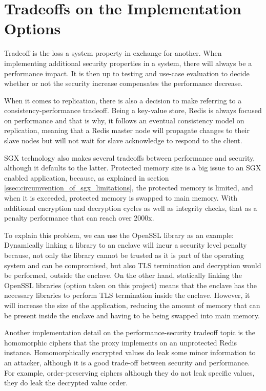 \section{Tradeoffs on the Implementation Options}
\label{sec:tradeoffs_implementation_options}

Tradeoff is the loss a system property in exchange for another. When implementing additional security properties in a system, there will always be a performance impact. It is then up to testing and use-case evaluation to decide whether or not the security increase compensates the performance decrease.

When it comes to replication, there is also a decision to make referring to a consistency-performance tradeoff. Being a key-value store, Redis is always focused on performance and that is why, it follows an eventual consistency model on replication, meaning that a Redis master node will propagate changes to their slave nodes but will not wait for slave acknowledge to respond to the client.

\gls{SGX} technology also makes several tradeoffs between performance and security, although it defaults to the latter. Protected memory size is a big issue to an \gls{SGX} enabled application, because, as explained in section \ref{ssec:circumvention_of_sgx_limitations}, the protected memory is limited, and when it is exceeded, protected memory is swapped to main memory. With additional encryption and decryption cycles as well as integrity checks, that as a penalty performance that can reach over 2000x. 

To explain this problem, we can use the OpenSSL library as an example: Dynamically linking a library to an enclave will incur a security level penalty because, not only the library cannot be trusted as it is part of the operating system and can be compromised, but also \gls{TLS} termination and decryption would be performed, outside the enclave. On the other hand, statically linking the OpenSSL libraries (option taken on this project) means that the enclave has the necessary libraries to perform \gls{TLS} termination inside the enclave. However, it will increase the size of the application, reducing the amount of memory that can be present inside the enclave and having to be being swapped into main memory.

Another implementation detail on the performance-security tradeoff topic is the homomorphic ciphers that the proxy implements on an unprotected Redis instance. Homomorphically encrypted values do leak some minor information to an attacker, although it is a good trade-off between security and performance. For example, order-preserving ciphers although they do not leak specific values, they do leak the decrypted value order.

